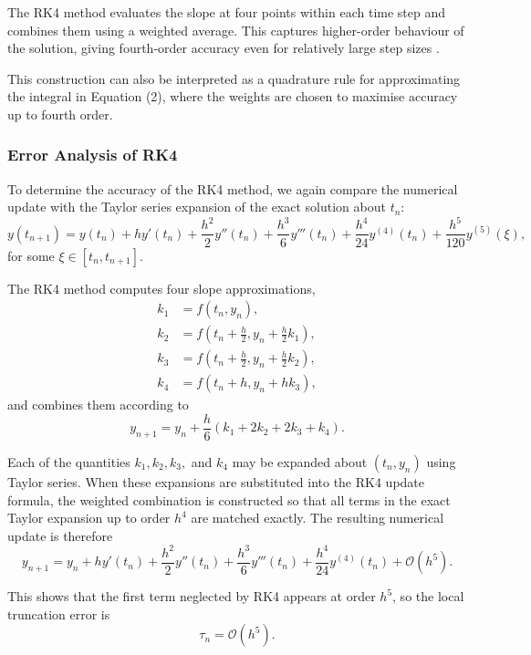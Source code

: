 \documentclass{article}
\begin{document}
The RK4 method evaluates the slope at four points within each time step and combines them using a weighted average. This captures higher-order behaviour of the solution, giving fourth-order accuracy even for relatively large step sizes \cite{1}.

This construction can also be interpreted as a quadrature rule \cite{10} for approximating the integral in Equation (2), where the weights are chosen to maximise accuracy up to fourth order.

\subsubsection{Error Analysis of RK4}

To determine the accuracy of the RK4 method, we again compare the numerical update with the Taylor series expansion of the exact solution about $t_n$:
\begin{equation}
y(t_{n+1}) = y(t_n) + h y'(t_n) + \frac{h^2}{2} y''(t_n) + \frac{h^3}{6} y'''(t_n) + \frac{h^4}{24} y^{(4)}(t_n) + \frac{h^5}{120} y^{(5)}(\xi),
\end{equation}
for some $\xi \in [t_n, t_{n+1}]$.

The RK4 method computes four slope approximations,
\begin{align}
k_1 &= f(t_n, y_n), \\
k_2 &= f\left(t_n + \frac{h}{2}, y_n + \frac{h}{2}k_1\right), \\
k_3 &= f\left(t_n + \frac{h}{2}, y_n + \frac{h}{2}k_2\right), \\
k_4 &= f(t_n + h, y_n + h k_3),
\end{align}
and combines them according to
\begin{equation}
y_{n+1} = y_n + \frac{h}{6}(k_1 + 2k_2 + 2k_3 + k_4).
\end{equation}

Each of the quantities $k_1, k_2, k_3,$ and $k_4$ may be expanded about $(t_n, y_n)$ using Taylor series. When these expansions are substituted into the RK4 update formula, the weighted combination is constructed so that all terms in the exact Taylor expansion up to order $h^4$ are matched exactly. The resulting numerical update is therefore
\begin{equation}
y_{n+1} = y_n + h y'(t_n) + \frac{h^2}{2} y''(t_n) + \frac{h^3}{6} y'''(t_n) + \frac{h^4}{24} y^{(4)}(t_n) + \mathcal{O}(h^5).
\end{equation}

This shows that the first term neglected by RK4 appears at order $h^5$, so the local truncation error is
\begin{equation}
\tau_n = \mathcal{O}(h^5).
\end{equation}
\end{document}
